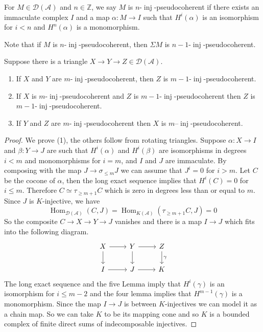 \documentclass[12pt,oneside]{amsart}
\DeclareMathOperator{\Hom}{Hom}
\DeclareMathOperator{\inj}{inj}
\begin{document}
\begin{defn} For $M \in \mathcal{D}(\mathcal{A})$ and $n \in \mathbb{Z}$, we say $M$ is $n$-$\inj$-pseudocoherent if there exists an immaculate complex $I$ and a map $\alpha: M \to I$ such that $H^i(\alpha)$ is an isomorphism for $i < n$  and $H^n(\alpha)$ is a monomorphism. 
\end{defn}

\begin{remark}
Note that if $M$ is $n$-$\inj$-pseudocoherent, then $\Sigma M$ is $n-1$-$\inj$-pseudocoherent. 
\end{remark}


\begin{lemma} \label{triainjfin} Suppose there is a triangle $X \to Y \to Z \in \mathcal{D}(\mathcal{A})$.
\begin{enumerate}
\item If $X$ and $Y$ are $m$-$\inj$-pseudocoherent, then $Z$ is $m-1$-$\inj$-pseudocoherent.

\item If $X$ is $m$-$\inj$-pseudocoherent and $Z$ is $m-1$-$\inj$-pseudocoherent then $Z$ is $m-1$-$\inj$-pseudocoherent.

\item If $Y$ and $Z$ are $m$-$\inj$-pseudocoherent then $X$ is $m$--$\inj$-pseudocoherent.
\end{enumerate}
\end{lemma}


\begin{proof}
We prove (1), the others follow from rotating triangles. Suppose $\alpha: X \to I$ and $\beta: Y \to J$ are such that $H^i(\alpha)$ and $H^i(\beta)$ are isomorphisms in degrees $i < m$ and monomorphisms for $i = m$, and $I$ and $J$ are immaculate. By composing with the map $J \to \sigma_{\leq m} J$ we can assume that $J^i= 0$ for $i > m$. Let $C$ be the cocone of $\alpha$, then the long exact sequence implies that $H^i(C) = 0$ for $i \leq m$. Therefore $C \simeq \tau_{\geq m+1} C$ which is zero in degrees less than or equal to $m$. Since $J$ is $K$-injective, we have
\[
\Hom_{\mathcal{D}(\mathcal{A})}(C,J) = \Hom_{K(\mathcal{A})}(\tau_{\geq m+1}C,J) = 0
\]
So the composite $C \to X \to Y \to J$ vanishes and there is a map $I \to J$ which fits into the following diagram.
\[
\begin{tikzcd}
X \arrow[r] \arrow[d] & Y \arrow[d] \arrow[r] & Z \arrow[d,"\gamma"] \\
I \arrow[r] & J \arrow[r] & K
\end{tikzcd}
\]
The long exact sequence and the five Lemma imply that $H^i(\gamma)$ is an isomorphism for $i \leq m-2$ and the four lemma implies that $H^{m-1}(\gamma)$ is a monomorphism. Since the map $I \to J$ is between $K$-injectives we can model it as a chain map. So we can take $K$ to be its mapping cone and so $K$ is a bounded complex of finite direct sums of indecomposable injectives.
\end{proof}
\end{document}
